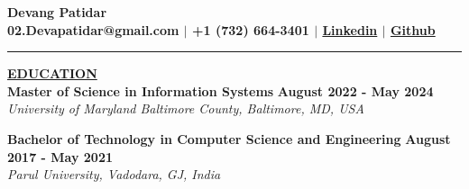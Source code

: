 \documentclass{article}
\begin{document}
\begin{center}
\thispagestyle{empty}
\large \textbf{Devang Patidar \\}
\normalsize \textbf{02.Devapatidar@gmail.com $\mid$ +1 (732) 664-3401 $\mid$ \href{https://www.linkedin.com/in/devang-patidar-1b6b4a179}{Linkedin} $\mid$ \href{https://github.com/T0nyy0rk}{Github} \\}
\rule{\textwidth}{1pt}
\end{center}







\noindent \textbf{\underline{EDUCATION}} \\
\textbf{Master of Science in Information Systems} \hfill \textbf{August 2022 - May 2024} \\
\textit{University of Maryland Baltimore County, Baltimore, MD, USA}
\begin{itemize}[noitemsep,nolistsep,leftmargin=*]
\end{itemize}
\begin{itemize}
\end{itemize}
\textbf{Bachelor of Technology in Computer Science and Engineering} \hfill \textbf{August 2017 - May 2021} \\
\textit{Parul University, Vadodara, GJ, India} \\


% 
%
\end{document}
